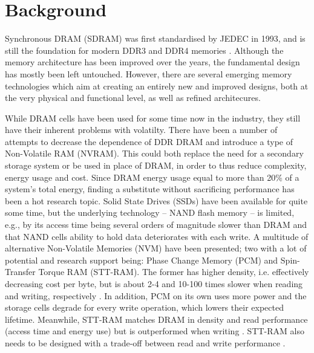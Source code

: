 \chapter{Background} \label{background}
Synchronous DRAM (SDRAM) was first standardised by JEDEC in 1993, and is still the foundation for modern DDR3 and DDR4 memories \cite{standard2008double}. Although the memory architecture has been improved over the years, the fundamental design has mostly been left untouched. However, there are several emerging memory technologies which aim at creating an entirely new and improved designs, both at the very physical and functional level, as well as refined architecures.
\bigskip

While DRAM cells have been used for some time now in the industry, they still have their inherent problems with volatilty. There have been a number of attempts to decrease the dependence of DDR DRAM and introduce a type of Non-Volatile RAM (NVRAM). This could both replace the need for a secondary storage system or be used in place of DRAM, in order to thus reduce complexity, energy usage and cost. Since DRAM energy usage equal to more than 20\% of a system's total energy, finding a substitute without sacrificing performance has been a hot research topic\cite{4658649}. Solid State Drives (SSDs) have been available for quite some time, but the underlying technology -- NAND flash memory -- is limited, e.g., by its access time being several orders of magnitude slower than DRAM and that NAND cells ability to hold data deteriorates with each write. A multitude of alternative Non-Volatile Memories (NVM) have been presented; two with a lot of potential and research support being: Phase Change Memory (PCM) and Spin-Transfer Torque RAM (STT-RAM). The former has higher density, i.e. effectively decreasing cost per byte, but is about 2-4 and 10-100 times slower when reading and writing, respectively \cite{Qureshi:2009:SHP:1555754.1555760, 5388621}. In addition, PCM on its own uses more power and the storage cells degrade for every write operation, which lowers their expected lifetime.  Meanwhile, STT-RAM matches DRAM in density and read performance (access time and energy use) but is outperformed when writing \cite{6557176, 6027811}. STT-RAM also needs to be designed with a trade-off between read and write performance \cite{Wang_2013, Khvalkovskiy_2013}.
\bigskip

